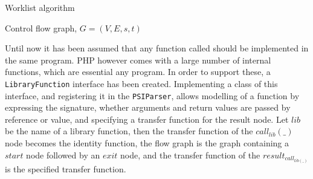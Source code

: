 \begin{algorithm}
\caption{Worklist algorithm}
\label{algo:worklist}
\begin{algorithmic}[1]
\scriptsize
\Require Control flow graph, $G=(V,E,s,t)$
	
		
		
	\EndIf
	
\EndWhile
\end{algorithmic}
\end{algorithm}

Until now it has been assumed that any function called should be implemented in the same program. PHP however comes with a large number of internal functions, which are essential any program. In order to support these, a \texttt{LibraryFunction} interface has been created. Implementing a class of this interface, and registering it in the \texttt{PSIParser}, allows modelling of a function by expressing the signature, whether arguments and return values are passed by reference or value, and specifying a transfer function for the result node. Let $\mathit{lib}$ be the name of a library function, then the transfer function of the $\mathit{call}_\mathit{lib}(\_)$ node becomes the identity function, the flow graph is the graph containing a $\mathit{start}$ node followed by an $\mathit{exit}$ node, and the transfer function of the $\mathit{result}_{\mathit{call}_{\mathit{lib}(\_)}}$ is the specified transfer function. 


